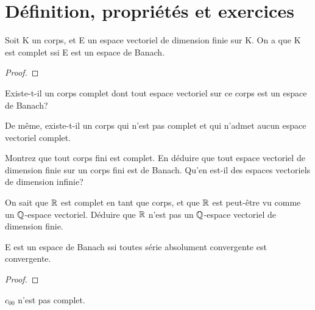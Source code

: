 \section{Définition, propriétés et exercices}


\begin{proposition}
	Soit K un corps, et E un espace vectoriel de dimension finie sur K. On a que
	K est complet ssi E est un espace de Banach.
\end{proposition}

\begin{proof}
	
\end{proof}

\begin{question}
	Existe-t-il un corps complet dont tout espace vectoriel sur ce corps est un
	espace de Banach?

	De même, existe-t-il un corps qui n'est pas complet et qui n'admet aucun
	espace vectoriel complet.
\end{question}

\begin{exercice}
	Montrez que tout corps fini est complet. En déduire que tout espace
	vectoriel de dimension finie sur un corps fini est de Banach. Qu'en est-il
	des espaces vectoriels de dimension infinie?
\end{exercice}

\begin{exercice}
	On sait que $\mathbb{R}$ est complet en tant que corps, et que $\mathbb{R}$ est
	peut-être vu comme un $\mathbb{Q}$-espace vectoriel. Déduire que $\mathbb{R}$
	n'est pas un $\mathbb{Q}$-espace vectoriel de dimension finie.
\end{exercice}

\begin{proposition}
	E est un espace de Banach ssi toutes série absolument convergente
	est convergente.
\end{proposition}

\begin{proof}
	
\end{proof}

\begin{exemple}
	$c_{00}$ n'est pas complet.
\end{exemple}

